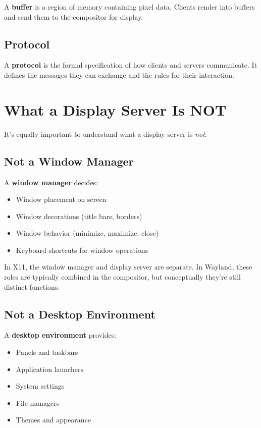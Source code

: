 \begin{definition}[Buffer]
A \textbf{buffer} is a region of memory containing pixel data. Clients render into buffers and send them to the compositor for display.
\end{definition}

\subsection{Protocol}

\begin{definition}[Protocol]
A \textbf{protocol} is the formal specification of how clients and servers communicate. It defines the messages they can exchange and the rules for their interaction.
\end{definition}

\section{What a Display Server Is NOT}

It's equally important to understand what a display server is \textit{not}:

\subsection{Not a Window Manager}

A \textbf{window manager} decides:
\begin{itemize}[leftmargin=*]
    \item Window placement on screen
    \item Window decorations (title bars, borders)
    \item Window behavior (minimize, maximize, close)
    \item Keyboard shortcuts for window operations
\end{itemize}

In X11, the window manager and display server are separate. In Wayland, these roles are typically combined in the compositor, but conceptually they're still distinct functions.

\subsection{Not a Desktop Environment}

A \textbf{desktop environment} provides:
\begin{itemize}[leftmargin=*]
    \item Panels and taskbars
    \item Application launchers
    \item System settings
    \item File managers
    \item Themes and appearance
\end{itemize}

